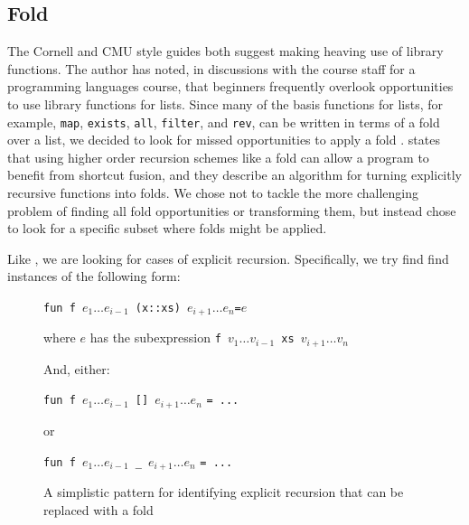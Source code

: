 \documentclass[12pt,abstracton]{scrartcl}
\begin{document}
\subsection{Fold}\label{subsec:fold}
The Cornell and CMU style guides both suggest making heaving use of library functions.
The author has noted, in discussions with the course staff for a programming languages course,
that beginners frequently overlook opportunities to
use library functions for lists. Since many of the basis functions
for lists, for example, \texttt{map}, \texttt{exists}, \texttt{all}, \texttt{filter},
and \texttt{rev}, can be written in terms of a fold over a list, we decided to look
for missed opportunities to apply a fold \cite{Jeu13}.
states that using higher order recursion schemes like a fold can allow a program
to benefit from shortcut fusion, and they
describe an algorithm for turning
explicitly recursive functions into folds.
We chose not to tackle the more challenging
problem of finding all fold opportunities or transforming them,
but instead chose to look for a specific
subset where folds might be applied.

Like \cite{Jeu13}, we are looking for cases of explicit recursion. Specifically, we try find
find instances of the following form:

\begin{figure}[!h]
\begin{center}
\texttt{fun f }\(e_{1}\ldots e_{i-1}\)\texttt{ (x::xs) }\(e_{i+1}\ldots e_{n}\)\texttt{=}\(e\)

where $e$ has the subexpression \texttt{f }\(v_{1}\ldots v_{i-1}\)\texttt{ xs }\(v_{i+1}\ldots v_{n}\)

And, either:

\texttt{fun f }\(e_{1}\ldots e_{i-1}\)\texttt{ [] }\(e_{i+1}\ldots e_{n}\) \texttt{= ...}

or

\texttt{fun f }\(e_{1}\ldots e_{i-1}\)\texttt{ \_ }\(e_{i+1}\ldots e_{n}\) \texttt{= ...}

\end{center}
\caption{A simplistic pattern for identifying explicit recursion that can be replaced with a fold}
\label{fig:folddef}
\end{figure}
\end{document}

